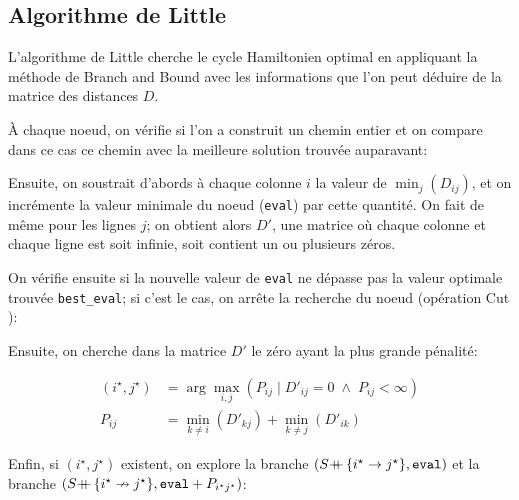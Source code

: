 \documentclass[12pt]{article}
\newcommand{\concat}{\ensuremath{\mbox{+\!\!\!+}\,}}
\begin{document}


\subsection{Algorithme de Little}

L'algorithme de Little cherche le cycle Hamiltonien optimal en appliquant la méthode de Branch and Bound avec les informations que l'on peut déduire de la matrice des distances $D$.

À chaque noeud, on vérifie si l'on a construit un chemin entier et on compare dans ce cas ce chemin avec la meilleure solution trouvée auparavant:



Ensuite, on soustrait d'abords à chaque colonne $i$ la valeur de $\min_{j}(D_{ij})$, et on incrémente la valeur minimale du noeud (\texttt{eval}) par cette quantité.
On fait de même pour les lignes $j$; on obtient alors $D'$, une matrice où chaque colonne et chaque ligne est soit infinie, soit contient un ou plusieurs zéros.



On vérifie ensuite si la nouvelle valeur de \texttt{eval} ne dépasse pas la valeur optimale trouvée \texttt{best\_eval}; si c'est le cas, on arrête la recherche du noeud (opération \og Cut \fg):



Ensuite, on cherche dans la matrice $D'$ le zéro ayant la plus grande pénalité:

\begin{align*}
  (i^{\star}, j^{\star}) &= \arg \max_{i,j}(P_{ij} \; | \; D'_{ij} = 0 \; \land \; P_{ij} < \infty) \\
  P_{ij} &= \min_{k \neq i}(D'_{kj}) + \min_{k \neq j}(D'_{ik})
\end{align*}



Enfin, si $(i^{\star}, j^{\star})$ existent, on explore la branche $(S \concat \{i^{\star} \rightarrow j^{\star}\}, \texttt{eval})$ et la branche $(S \concat \{i^{\star} \nrightarrow j^{\star}\}, \texttt{eval} + P_{i^{\star}j^{\star}})$:


\end{document}
